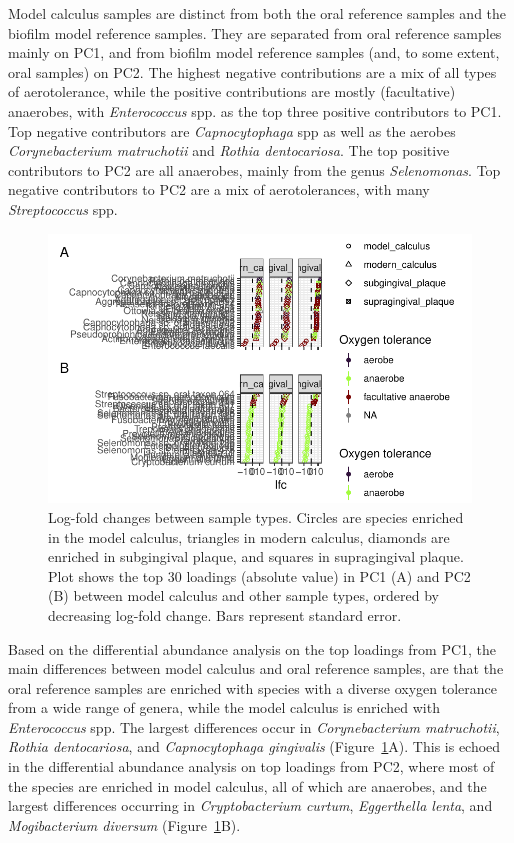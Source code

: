\documentclass[
]{article}
\begin{document}
Model calculus samples are distinct from both the oral reference samples
and the biofilm model reference samples. They are separated from oral
reference samples mainly on PC1, and from biofilm model reference
samples (and, to some extent, oral samples) on PC2. The highest negative
contributions are a mix of all types of aerotolerance, while the
positive contributions are mostly (facultative) anaerobes, with
\emph{Enterococcus} spp. as the top three positive contributors to PC1.
Top negative contributors are \emph{Capnocytophaga} spp as well as the
aerobes \emph{Corynebacterium matruchotii} and \emph{Rothia
dentocariosa}. The top positive contributors to PC2 are all anaerobes,
mainly from the genus \emph{Selenomonas}. Top negative contributors to
PC2 are a mix of aerotolerances, with many \emph{Streptococcus} spp.

\begin{figure}

{\centering \includegraphics{figures/fig-diffabund-comp2-1.pdf}

}

\caption{\label{fig-diffabund-comp2}Log-fold changes between sample
types. Circles are species enriched in the model calculus, triangles in
modern calculus, diamonds are enriched in subgingival plaque, and
squares in supragingival plaque. Plot shows the top 30 loadings
(absolute value) in PC1 (A) and PC2 (B) between model calculus and other
sample types, ordered by decreasing log-fold change. Bars represent
standard error.}

\end{figure}

Based on the differential abundance analysis on the top loadings from
PC1, the main differences between model calculus and oral reference
samples, are that the oral reference samples are enriched with species
with a diverse oxygen tolerance from a wide range of genera, while the
model calculus is enriched with \emph{Enterococcus} spp. The largest
differences occur in \emph{Corynebacterium matruchotii}, \emph{Rothia
dentocariosa}, and \emph{Capnocytophaga gingivalis}
(Figure~\ref{fig-diffabund-comp2}A). This is echoed in the differential
abundance analysis on top loadings from PC2, where most of the species
are enriched in model calculus, all of which are anaerobes, and the
largest differences occurring in \emph{Cryptobacterium curtum},
\emph{Eggerthella lenta}, and \emph{Mogibacterium diversum}
(Figure~\ref{fig-diffabund-comp2}B).
\end{document}
